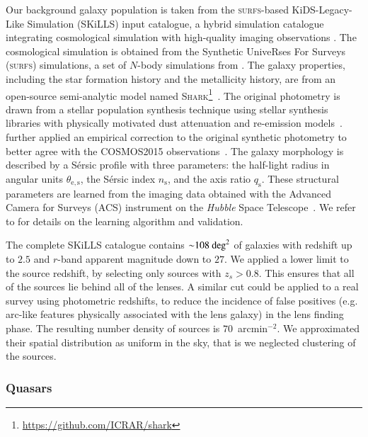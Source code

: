 \documentclass{aa}
\begin{document}
Our background galaxy population is taken from the \textsc{surfs}-based KiDS-Legacy-Like Simulation (SKiLLS) input catalogue, a hybrid simulation catalogue integrating cosmological simulation with high-quality imaging observations \citep{Li++23}. The cosmological simulation is obtained from the Synthetic UniveRses For Surveys (\textsc{surfs}) simulations, a set of $N$-body simulations from \citet{Ela++18}. The galaxy properties, including the star formation history and the metallicity history, are from an open-source semi-analytic model named \textsc{Shark}\footnote{\url{https://github.com/ICRAR/shark}}~\citep{Lag++18}. The original photometry is drawn from a stellar population synthesis technique using stellar synthesis libraries with physically motivated dust attenuation and re-emission models~\citep{Rob++20}. \citet{Li++23} further applied an empirical correction to the original synthetic photometry to better agree with the COSMOS2015 observations~\citep{Lai++16}. The galaxy morphology is described by a S\'ersic profile with three parameters: the half-light radius in angular units $\theta_{
\mathrm{e,s}}$, the S\'ersic index $n_\mathrm{s}$, and the axis ratio $q_\mathrm{s}$. These structural parameters are learned from the imaging data obtained with the Advanced Camera for Surveys (ACS) instrument on the \textit{Hubble} Space Telescope~\citep{Gri++12}. We refer to \citet{Li++23} for details on the learning algorithm and validation.

The complete SKiLLS catalogue contains ${\sim}108~{\rm deg}^2$ of galaxies with redshift up to $2.5$ and $r$-band apparent magnitude down to $27$.
We applied a lower limit to the source redshift, by selecting only sources with $z_s > 0.8$.
This ensures that all of the sources lie behind all of the lenses.
A similar cut could be applied to a real survey using photometric redshifts, to reduce the incidence of false positives (e.g. arc-like features physically associated with the lens galaxy) in the lens finding phase.
The resulting number density of sources is $70$~arcmin$^{-2}$.
We approximated their spatial distribution as uniform in the sky, that is we neglected clustering of the sources.

\subsubsection{Quasars}\label{ssub:quasars}
\end{document}
